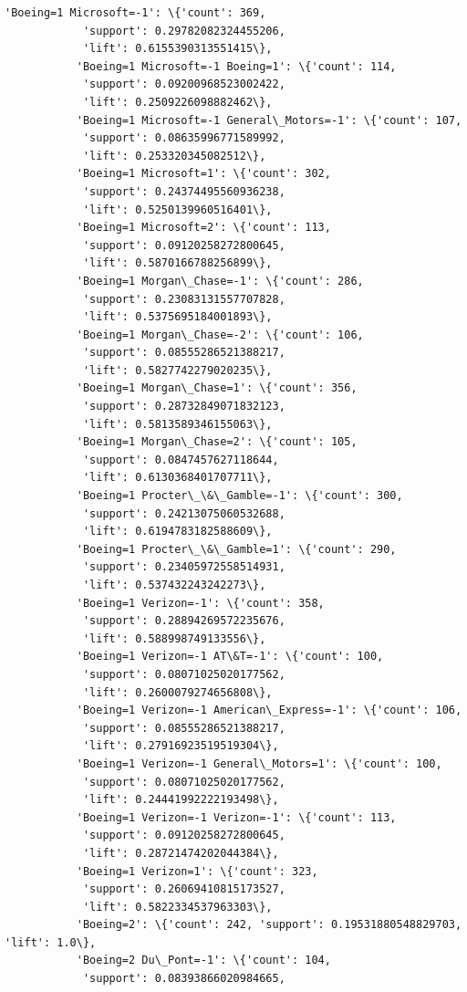\documentclass[11pt]{article}
\begin{document}
\begin{Verbatim}[commandchars=\\\{\}]
           'Boeing=1 Microsoft=-1': \{'count': 369,
            'support': 0.29782082324455206,
            'lift': 0.6155390313551415\},
           'Boeing=1 Microsoft=-1 Boeing=1': \{'count': 114,
            'support': 0.09200968523002422,
            'lift': 0.2509226098882462\},
           'Boeing=1 Microsoft=-1 General\_Motors=-1': \{'count': 107,
            'support': 0.08635996771589992,
            'lift': 0.253320345082512\},
           'Boeing=1 Microsoft=1': \{'count': 302,
            'support': 0.24374495560936238,
            'lift': 0.5250139960516401\},
           'Boeing=1 Microsoft=2': \{'count': 113,
            'support': 0.09120258272800645,
            'lift': 0.5870166788256899\},
           'Boeing=1 Morgan\_Chase=-1': \{'count': 286,
            'support': 0.23083131557707828,
            'lift': 0.5375695184001893\},
           'Boeing=1 Morgan\_Chase=-2': \{'count': 106,
            'support': 0.08555286521388217,
            'lift': 0.5827742279020235\},
           'Boeing=1 Morgan\_Chase=1': \{'count': 356,
            'support': 0.28732849071832123,
            'lift': 0.5813589346155063\},
           'Boeing=1 Morgan\_Chase=2': \{'count': 105,
            'support': 0.0847457627118644,
            'lift': 0.6130368401707711\},
           'Boeing=1 Procter\_\&\_Gamble=-1': \{'count': 300,
            'support': 0.24213075060532688,
            'lift': 0.6194783182588609\},
           'Boeing=1 Procter\_\&\_Gamble=1': \{'count': 290,
            'support': 0.23405972558514931,
            'lift': 0.537432243242273\},
           'Boeing=1 Verizon=-1': \{'count': 358,
            'support': 0.28894269572235676,
            'lift': 0.588998749133556\},
           'Boeing=1 Verizon=-1 AT\&T=-1': \{'count': 100,
            'support': 0.08071025020177562,
            'lift': 0.2600079274656808\},
           'Boeing=1 Verizon=-1 American\_Express=-1': \{'count': 106,
            'support': 0.08555286521388217,
            'lift': 0.27916923519519304\},
           'Boeing=1 Verizon=-1 General\_Motors=1': \{'count': 100,
            'support': 0.08071025020177562,
            'lift': 0.24441992222193498\},
           'Boeing=1 Verizon=-1 Verizon=-1': \{'count': 113,
            'support': 0.09120258272800645,
            'lift': 0.28721474202044384\},
           'Boeing=1 Verizon=1': \{'count': 323,
            'support': 0.26069410815173527,
            'lift': 0.5822334537963303\},
           'Boeing=2': \{'count': 242, 'support': 0.19531880548829703, 'lift': 1.0\},
           'Boeing=2 Du\_Pont=-1': \{'count': 104,
            'support': 0.08393866020984665,

\end{Verbatim}
\end{document}
